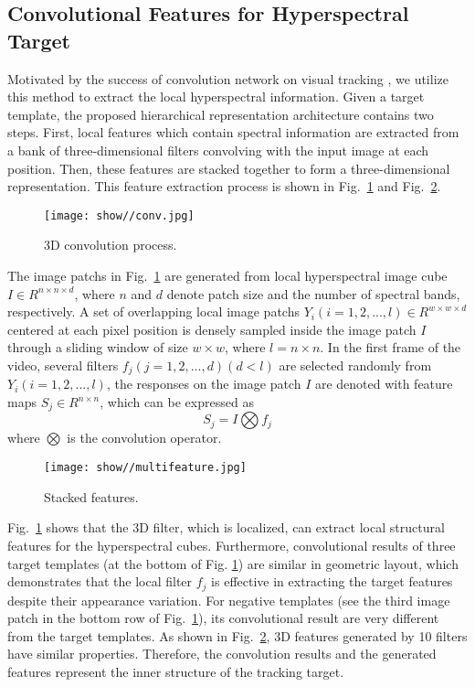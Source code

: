\documentclass[runningheads,a4paper]{llncs}
\begin{document}
\subsection{Convolutional Features for Hyperspectral Target}
Motivated by the success of convolution network on visual tracking \cite{CNT}, we utilize this method to extract the local hyperspectral information. Given a target template, the proposed hierarchical representation architecture contains two steps. First, local features which contain spectral information are extracted from a bank of three-dimensional filters convolving with the input image at each position. Then, these features are stacked together to form a three-dimensional representation. This feature extraction process is shown in Fig.~\ref{conv} and Fig.~\ref{stacking}.
\begin{figure}[htbp]
\centering
  \texttt{[image: show//conv.jpg]}
    \caption{3D convolution process. }\label{conv}
\end{figure}

The image patchs in Fig.~\ref{conv} are generated from local hyperspectral image cube $I \in R^{n \times n \times d}$, where $n$ and $d$ denote patch size and the number of spectral bands, respectively. A set of overlapping local image patchs $Y_i (i=1,2,...,l)\in R^{w \times w \times d}$ centered at each pixel position is densely sampled inside the image patch $I$ through a sliding window of size $w \times w$, where $l=n \times n$. In the first frame of the video, several filters $f_j(j=1,2,...,d)(d<l)$ are selected randomly from $Y_i (i=1,2,...,l)$, the responses on the image patch $I$ are denoted with feature maps $S_j \in R^{n \times n}$, which can be expressed as
\begin{equation}\label{1}
S_j=I \bigotimes f_j
\end{equation}
where $\bigotimes$ is the convolution operator.
\begin{figure}[htbp]
\centering
  \texttt{[image: show//multifeature.jpg]}
    \caption{Stacked features. }\label{stacking}
\end{figure}

Fig.~\ref{conv} shows that the 3D filter, which is localized, can extract local structural features for the hyperspectral cubes. Furthermore, convolutional results of three target templates (at the bottom of Fig. \ref{conv}) are similar in geometric layout, which demonstrates that the local filter $f_j$ is effective in extracting the target features despite their appearance variation. For negative templates (see the third image patch in the bottom row of Fig.~\ref{conv}), its convolutional result are very different from the target templates. As shown in Fig.~\ref{stacking}, 3D features generated by 10 filters have similar properties. Therefore, the convolution results and the generated features represent the inner structure of the tracking target.
\end{document}
